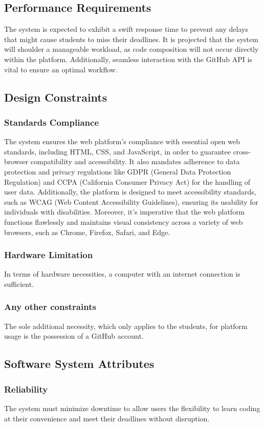 \documentclass[12pt,oneside,a4paper]{article}
\begin{document}
\subsection{Performance Requirements}
The system is expected to exhibit a swift response time to prevent any delays that might cause students to miss their deadlines. It is projected that the system will shoulder a manageable workload, as code composition will not occur directly within the platform. Additionally, seamless interaction with the GitHub API is vital to ensure an optimal workflow.

\subsection{Design Constraints}
\subsubsection{Standards Compliance}
The system ensures the web platform's compliance with essential open web standards, including HTML, CSS, and JavaScript, in order to guarantee cross-browser compatibility and accessibility. It also mandates adherence to data protection and privacy regulations like GDPR (General Data Protection Regulation) and CCPA (California Consumer Privacy Act) for the handling of user data. Additionally, the platform is designed to meet accessibility standards, such as WCAG (Web Content Accessibility Guidelines), ensuring its usability for individuals with disabilities. Moreover, it's imperative that the web platform functions flawlessly and maintains visual consistency across a variety of web browsers, such as Chrome, Firefox, Safari, and Edge.
\subsubsection{Hardware Limitation}
In terms of hardware necessities, a computer with an internet connection is sufficient.
\subsubsection{Any other constraints}
The sole additional necessity, which only applies to the students, for platform usage is the possession of a GitHub account.
\subsection{Software System Attributes}
\subsubsection{Reliability}
The system must minimize downtime to allow users the flexibility to learn coding at their convenience and meet their deadlines without disruption.
\end{document}
